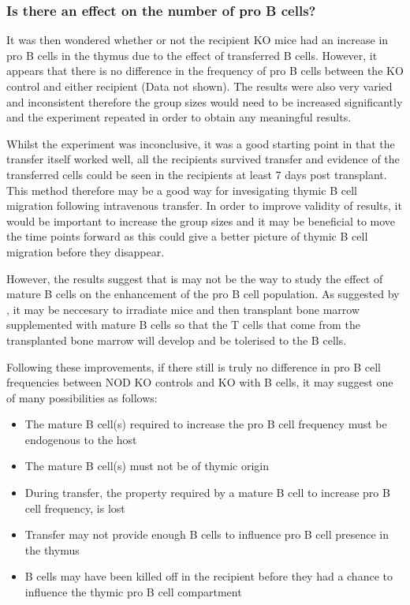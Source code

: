 \subsubsection{Is there an effect on the number of pro B cells?}

It was then wondered whether or not the recipient KO mice had an increase in pro B cells in the thymus due to the effect of transferred B cells.
However, it appears that there is no difference in the frequency of pro B cells between the KO control and either recipient (Data not shown).
The results were also very varied and inconsistent therefore the group sizes would need to be increased significantly and the experiment repeated in order to obtain any meaningful results.

Whilst the experiment was inconclusive, it was a good starting point in that the transfer itself worked well, all the recipients survived transfer and evidence of the transferred cells could be seen in the recipients at least 7 days post transplant.
This method therefore may be a good way for invesigating thymic B cell migration following intravenous transfer.
In order to improve validity of results, it would be important to increase the group sizes and it may be beneficial to move the time points forward as this could give a better picture of thymic B cell migration before they disappear.

However, the results suggest that is may not be the way to study the effect of mature B cells on the enhancement of the pro B cell population.
As suggested by \citet{Serreze1998}, it may be neccesary to irradiate mice and then transplant bone marrow supplemented with mature B cells so that the T cells that come from the transplanted bone marrow will develop and be tolerised to the B cells.

Following these improvements, if there still is truly no difference in pro B cell frequencies between NOD KO controls and KO with B cells, it may suggest one of many possibilities as follows:
\begin{itemize}
\item The mature B cell(s) required to increase the pro B cell frequency must be endogenous to the host
\item The mature B cell(s) must not be of thymic origin
\item During transfer, the property required by a mature B cell to increase pro B cell frequency, is lost
\item Transfer may not provide enough B cells to influence pro B cell presence in the thymus
\item B cells may have been killed off in the recipient before they had a chance to influence the thymic pro B cell compartment
\end{itemize}

